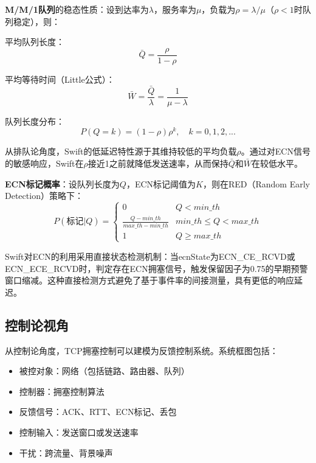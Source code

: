 \textbf{M/M/1队列}的稳态性质：设到达率为$\lambda$，服务率为$\mu$，负载为$\rho = \lambda/\mu$（$\rho < 1$时队列稳定），则：

平均队列长度：
\begin{equation}
\bar{Q} = \frac{\rho}{1-\rho}
\end{equation}

平均等待时间（Little公式）：
\begin{equation}
\bar{W} = \frac{\bar{Q}}{\lambda} = \frac{1}{\mu - \lambda}
\end{equation}

队列长度分布：
\begin{equation}
P(Q = k) = (1-\rho)\rho^k, \quad k = 0, 1, 2, ...
\end{equation}

从排队论角度，Swift的低延迟特性源于其维持较低的平均负载$\rho$。通过对ECN信号的敏感响应，Swift在$\rho$接近1之前就降低发送速率，从而保持$\bar{Q}$和$\bar{W}$在较低水平。

\textbf{ECN标记概率}：设队列长度为$Q$，ECN标记阈值为$K$，则在RED（Random Early Detection）策略下：
\begin{equation}
P(\text{标记}|Q) = \begin{cases}
0 & Q < min\_th \\
\frac{Q - min\_th}{max\_th - min\_th} & min\_th \leq Q < max\_th \\
1 & Q \geq max\_th
\end{cases}
\end{equation}

Swift对ECN的利用采用直接状态检测机制：当ecnState为ECN\_CE\_RCVD或ECN\_ECE\_RCVD时，判定存在ECN拥塞信号，触发保留因子为0.75的早期预警窗口缩减。这种直接检测方式避免了基于事件率的间接测量，具有更低的响应延迟。

\subsection{控制论视角}

从控制论角度，TCP拥塞控制可以建模为反馈控制系统。系统框图包括：
\begin{itemize}
    \item 被控对象：网络（包括链路、路由器、队列）
    \item 控制器：拥塞控制算法
    \item 反馈信号：ACK、RTT、ECN标记、丢包
    \item 控制输入：发送窗口或发送速率
    \item 干扰：跨流量、背景噪声
\end{itemize}


